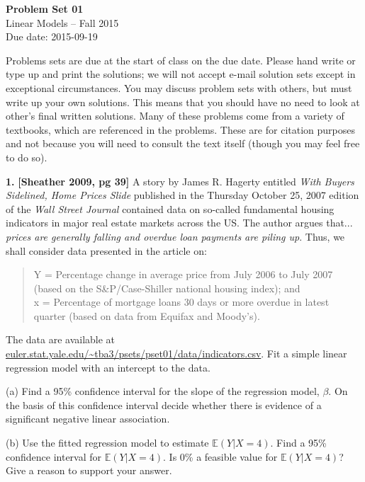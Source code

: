 \documentclass[12pt]{article}
\begin{document}
\begin{center}
{\bf Problem Set 01} \\
Linear Models -- Fall 2015 \\
Due date: 2015-09-19
\end{center}

\medskip

Problems sets are due at the start of class on the due date. Please hand write
or type up and print the solutions; we will not accept e-mail solution sets except
in exceptional circumstances. You may discuss problem sets with others, but must
write up your own solutions. This means that you should have no need to look at other's
final written solutions. Many of these problems come from a variety of textbooks,
which are referenced in the problems. These are for citation purposes and not because
you will need to consult the text itself (though you may feel free to do so).

\medskip

{\bf 1.} {\bf [Sheather 2009, pg 39]} A story by James R. Hagerty entitled {\it With Buyers Sidelined, Home Prices Slide} published in the Thursday October 25, 2007 edition of the {\it Wall Street Journal} contained data on so-called fundamental housing indicators in major real estate markets across the US. The author argues that... {\it prices are generally falling and overdue loan payments are piling up}. Thus, we shall consider data presented in the article on:

\begin{quote}
Y = Percentage change in average price from July 2006 to July 2007 (based on the S\&P/Case-Shiller national housing index); and \\
x = Percentage of mortgage loans 30 days or more overdue in latest quarter (based on data from Equifax and Moody’s).
\end{quote}

The data are available at \url{euler.stat.yale.edu/~tba3/psets/pset01/data/indicators.csv}. Fit a simple linear regression model with an intercept to the data.

(a) Find a 95\% confidence interval for the slope of the regression model, $\beta$. On the basis of this confidence interval decide whether there is evidence of a significant negative linear association.

(b) Use the fitted regression model to estimate $\mathbb{E}(Y | X=4)$. Find a 95\% confidence interval for $\mathbb{E}(Y | X=4)$. Is 0\% a feasible value for $\mathbb{E}(Y | X=4)$? Give a reason to support your answer.
\end{document}
